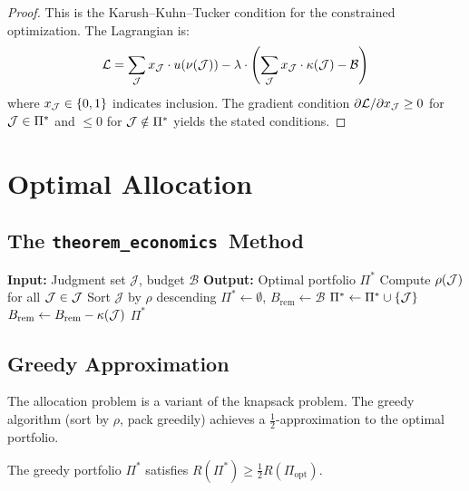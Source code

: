 \documentclass[11pt]{article}
\newcommand{\VerifBudget}{\mathcal{B}}
\newcommand{\TrustValue}{\nu}
\newcommand{\VerifCost}{\kappa}
\newcommand{\TrustReturn}{\rho}
\newcommand{\ThmEcon}{\texttt{theorem\_economics}}
\newcommand{\Shadow}{\lambda}
\newcommand{\Lagr}{\mathcal{L}}
\begin{document}
\begin{proof}
This is the Karush--Kuhn--Tucker condition for the constrained
optimization.  The Lagrangian is:
\[
  \Lagr = \sum_{\J} x_{\J} \cdot u(\TrustValue(\J)) -
  \Shadow \cdot \left(\sum_{\J} x_{\J} \cdot \VerifCost(\J) - \VerifBudget\right)
\]
where $x_{\mathcal{J}} \in \{0,1\}$ indicates inclusion.  The gradient condition
$\partial \Lagr / \partial x_{\J} \geq 0$ for $\mathcal{J} \in \Pi^*$ and
$\leq 0$ for $\mathcal{J} \notin \Pi^*$ yields the stated conditions.
\end{proof}

\section{Optimal Allocation}\label{sec:allocation}

\subsection{The \ThmEcon\ Method}

\begin{algorithm}[H]
\caption{Theorem Economics Allocation}
\label{alg:allocation}
\begin{algorithmic}[1]
\STATE \textbf{Input:} Judgment set $\mathcal{J}$, budget $\VerifBudget$
\STATE \textbf{Output:} Optimal portfolio $\Pi^*$
\STATE Compute $\TrustReturn(\J)$ for all $\mathcal{J} \in \mathcal{J}$
\STATE Sort $\mathcal{J}$ by $\TrustReturn$ descending
\STATE $\Pi^* \gets \emptyset$, $B_{\text{rem}} \gets \VerifBudget$
  \IF{$\VerifCost(\J) \leq B_{\text{rem}}$}
    \STATE $\Pi^* \gets \Pi^* \cup \{\mathcal{J}\}$
    \STATE $B_{\text{rem}} \gets B_{\text{rem}} - \VerifCost(\J)$
  \ENDIF
\ENDFOR
\RETURN $\Pi^*$
\end{algorithmic}
\end{algorithm}

\subsection{Greedy Approximation}
The allocation problem is a variant of the knapsack problem.  The
greedy algorithm (sort by $\TrustReturn$, pack greedily) achieves a
$\tfrac{1}{2}$-approximation to the optimal portfolio.

\begin{theorem}\label{thm:approx}
The greedy portfolio $\Pi^*$ satisfies $R(\Pi^*) \geq
\tfrac{1}{2} R(\Pi_{\text{opt}})$.
\end{theorem}
\end{document}
